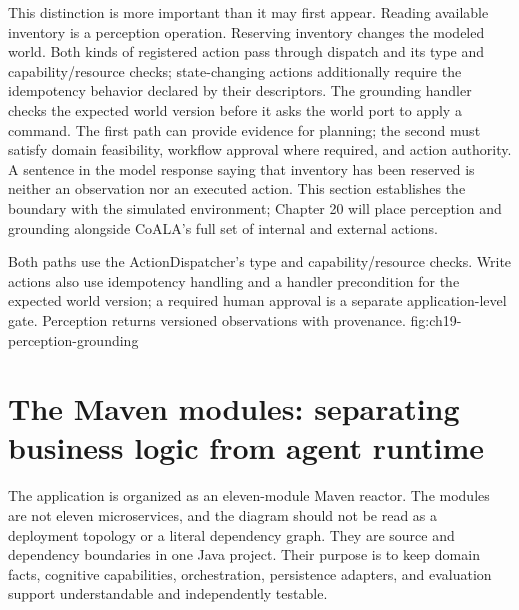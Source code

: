 This distinction is more important than it may first appear. Reading available inventory is a perception operation. Reserving inventory changes the modeled world. Both kinds of registered action pass through dispatch and its type and capability/resource checks; state-changing actions additionally require the idempotency behavior declared by their descriptors. The grounding handler checks the expected world version before it asks the world port to apply a command. The first path can provide evidence for planning; the second must satisfy domain feasibility, workflow approval where required, and action authority. A sentence in the model response saying that inventory has been reserved is neither an observation nor an executed action. This section establishes the boundary with the simulated environment; Chapter 20 will place perception and grounding alongside CoALA's full set of internal and external actions.

  {Both paths use the ActionDispatcher's type and capability/resource checks. Write actions also use idempotency handling and a handler precondition for the expected world version; a required human approval is a separate application-level gate. Perception returns versioned observations with provenance.}
  {fig:ch19-perception-grounding}

\section{The Maven modules: separating business logic from agent runtime}
\label{sec:ch19-modules}

The application is organized as an eleven-module Maven reactor. The modules are not eleven microservices, and the diagram should not be read as a deployment topology or a literal dependency graph. They are source and dependency boundaries in one Java project. Their purpose is to keep domain facts, cognitive capabilities, orchestration, persistence adapters, and evaluation support understandable and independently testable.

